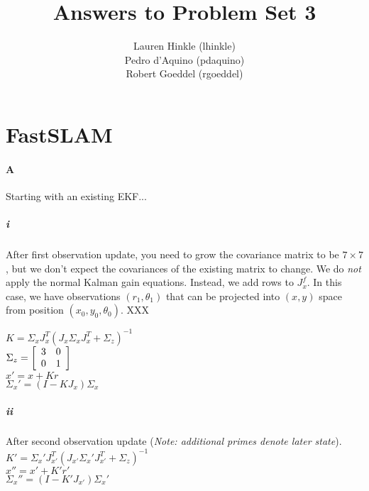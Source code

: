 \documentclass[12pt]{article}
\title{Answers to Problem Set 3}
\author{
	Lauren Hinkle (lhinkle)\\
	Pedro d'Aquino (pdaquino)\\
	Robert Goeddel (rgoeddel)}
\begin{document}
\maketitle
\pagebreak

\section{FastSLAM}

\paragraph{A}
Starting with an existing EKF...
\subparagraph{i}
After first observation update, you need to grow the covariance matrix to
be $7 \times 7$, but we don't expect the covariances of the existing matrix
to change. We do \emph{not} apply the normal Kalman gain equations. Instead,
we add rows to $J_x^f$. %
In this case, we have observations $(r_1, \theta_1)$ that can be projected
into $(x,y)$ space from position $(x_0, y_0, \theta_0)$.
XXX %

$K = \Sigma_x J_x^T(J_x \Sigma_x J_x^T + \Sigma_z)^{-1} $ \\
$\Sigma_z = \left[ \begin{array}{c c}
3 & 0 \\
0 & 1 \\
\end{array} \right]$ \\
$x' = x + Kr$ \\
$\Sigma_x' = (I - KJ_x) \Sigma_x$ \\

\subparagraph{ii}
After second observation update (\emph{Note: additional primes denote
    later state}).
$K' = \Sigma_x' J_{x'}^T(J_{x'} \Sigma_x' J_{x'}^T + \Sigma_z)^{-1} $ \\
$x'' = x' + K'r'$ \\
$\Sigma_x'' = (I - K'J_{x'}) \Sigma_x'$ \\
\end{document}

